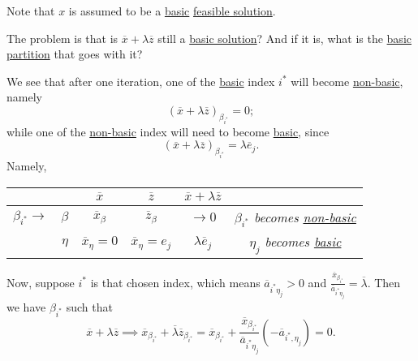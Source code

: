 \begin{remark}
	Note that \(x\) is assumed to be a \hyperref[def:basic-solution]{basic} \hyperref[def:feasible-solution]{feasible solution}.
\end{remark}
\begin{problem}
The problem is that is \(\overline{x}+\lambda \overline{z}\) still a \hyperref[def:basic-solution]{basic solution}? And if it is, what is the \hyperref[def:basic-partition]{basic partition}
that goes with it?
\end{problem}
\begin{answer}
	We see that after one iteration, one of the \hyperref[def:basic]{basic} index \(i^{\ast}\) will become \hyperref[def:non-basic]{non-basic}, namely
	\[
		(\overline{x} + \lambda \overline{z})_{\beta_{i^{\ast}}} = 0;
	\]
	while one of the \hyperref[def:non-basic]{non-basic} index will need to become \hyperref[def:basic]{basic}, since
	\[
		(\overline{x} + \lambda \overline{z})_{\beta_{i^{\ast}}} = \lambda \overline{e}_j.
	\]
	Namely,
	\begin{table}[H]
		\centering
		\begin{tabular}{cc|c|c|cc}
			\toprule
			                          &           & \(\overline{x}\)            & \(\overline{z}\)                & \(\overline{x} + \lambda \overline{z}\) &                                                                         \\
			\midrule
			\(\beta_{i^{\ast}} \to \) & \(\beta\) & \(\overline{x}_{\beta}\)    & \(\overline{z}_{\beta}\)        & \(\to 0\)                               & \emph{\(\beta_{i^{\ast}}\) becomes \hyperref[def:non-basic]{non-basic}} \\\hline
			                          & \(\eta\)  & \(\overline{x}_{\eta} = 0\) & \(\overline{x}_{\eta} = e_{j}\) & \(\lambda \overline{e}_j\)              & \emph{\(\eta_{j}\) becomes \hyperref[def:basic]{basic}}                 \\
			\bottomrule
		\end{tabular}
	\end{table}
\end{answer}

Now, suppose \(i^{\ast}\) is that chosen index, which means \(\overline{a}_{i^{\ast} \eta_{j}}>0\) and \(\frac{\overline{x}_{\beta_{i^{\ast}}}}{\overline{a}_{i^{\ast} \eta_{j}}} = \overline{\lambda}\). Then we have
\(\beta_{i^{\ast}}\) such that
\[
	\overline{x} + \lambda \overline{z} \implies \overline{x}_{\beta_{i^{\ast}}} + \overline{\lambda} \overline{z}_{\beta_{i^{\ast}}} = \overline{x}_{\beta_{i^{\ast}}}+\frac{\overline{x}_{\beta_{i^{\ast}}}}{\overline{a}_{i^{\ast} \eta_{j}}}\left( -\overline{a}_{i^{\ast}, \eta_{j}} \right) = 0.
\]

